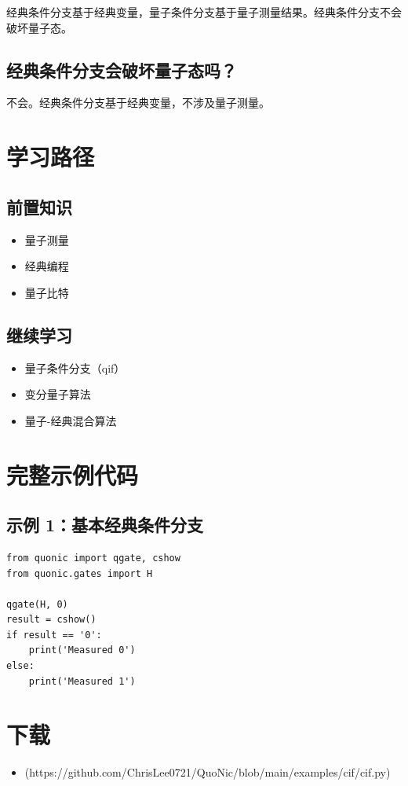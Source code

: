 \documentclass[12pt,a4paper]{article}
\begin{document}
经典条件分支基于经典变量，量子条件分支基于量子测量结果。经典条件分支不会破坏量子态。

\subsection{经典条件分支会破坏量子态吗？}

不会。经典条件分支基于经典变量，不涉及量子测量。

\section{学习路径}

\subsection{前置知识}
\begin{itemize}
  \item 量子测量
  \item 经典编程
  \item 量子比特
\end{itemize}

\subsection{继续学习}
\begin{itemize}
  \item 量子条件分支（qif）
  \item 变分量子算法
  \item 量子-经典混合算法
\end{itemize}

\section{完整示例代码}

\subsection{示例 1：基本经典条件分支}

\begin{verbatim}
from quonic import qgate, cshow
from quonic.gates import H

qgate(H, 0)
result = cshow()
if result == '0':
    print('Measured 0')
else:
    print('Measured 1')
\end{verbatim}

\section{下载}

\begin{itemize}
  \item [cif.py](https://github.com/ChrisLee0721/QuoNic/blob/main/examples/cif/cif.py)
\end{itemize}
\end{document}
